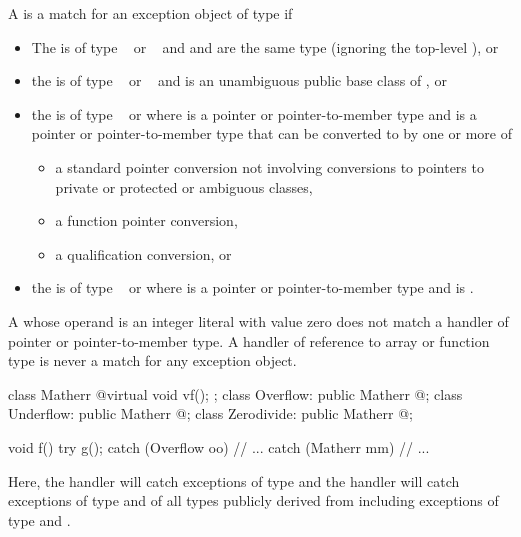 \pnum
{}%
A
is a match for
an exception object
of type
if
\begin{itemize}
\item%
The  is of type \cv{}~ or
\cv{}~ and
 and 
are the same type (ignoring the top-level ), or
\item%
the  is of type \cv{}~ or
\cv{}~ and
 is an unambiguous public base class of , or
\item%
the  is of type \cv{}~ or 
where  is a pointer or pointer-to-member type and
 is a pointer or pointer-to-member type
that can be converted to  by one or more of
\begin{itemize}

\item%
a standard pointer conversion not involving conversions
to pointers to private or protected or ambiguous classes,
\item%
a function pointer conversion,
\item%
a qualification conversion, or

\end{itemize}

\item
the  is of type \cv{}~ or  where  is a pointer or pointer-to-member type and  is .

\end{itemize}

\begin{note}
A
whose operand is an integer literal with value zero does not match a handler of
pointer or pointer-to-member type.
A handler of reference to array or function type
is never a match for any exception object.
\end{note}

\begin{example}
\begin{codeblock}
class Matherr { @\commentellip@ virtual void vf(); };
class Overflow: public Matherr { @\commentellip@ };
class Underflow: public Matherr { @\commentellip@ };
class Zerodivide: public Matherr { @\commentellip@ };

void f() {
  try {
    g();
  } catch (Overflow oo) {
    // ...
  } catch (Matherr mm) {
    // ...
  }
}
\end{codeblock}
Here, the
handler will catch exceptions of type
and the
handler will catch exceptions of type
and of all types publicly derived from
including exceptions of type
and
.
\end{example}

